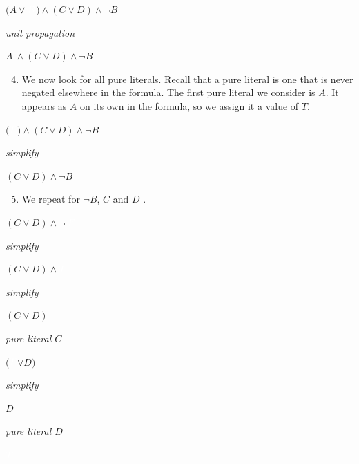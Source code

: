 \documentclass[a4paper,openany]{book}
\begin{document}
\begin{center}
\setlength{\fboxsep}{2pt}
\(
(A \lor \)\colorbox{id7-aubergine}{$ \textcolor{white}{B}$}\() \land (C \lor D) \land \neg B\)

\emph{unit propagation}

\(A ~\land (C \lor D) \land \neg B\)

\end{center}

\begin{enumerate}
      \setcounter{enumi}{3}
      \item We now look for all pure literals. Recall that a pure literal is one that is never negated elsewhere in the formula. The first pure literal we consider is $A$. It appears as $A$ on its own in the formula, so we assign it a value of $T$.
\end{enumerate}

\begin{center}
    \setlength{\fboxsep}{2pt}
    \(
    (\)\colorbox{id7-aubergine}{$ \textcolor{white}{T}$}\() \land (C \lor D) \land \neg B\)
    
    \emph{simplify}
    
    \((C \lor D) \land \neg B\)
\end{center}


\begin{enumerate}
\setcounter{enumi}{4}
\item We repeat for $\neg B$, $C$ and $D$ .
\end{enumerate}

\begin{center}
    \setlength{\fboxsep}{2pt}
    
    \((C \lor D) \land \neg ~ \)\colorbox{id7-aubergine}{$ \textcolor{white}{F}$}
    
    \emph{simplify}
    
    \((C \lor D) \land \)\colorbox{id7-aubergine}{$ \textcolor{white}{T}$}
        
    \emph{simplify}
    
    \((C \lor D)\)
    
    \emph{pure literal $C$}
    
    \((\)\colorbox{id7-aubergine}{$ \textcolor{white}{T}$}\( \lor D)\)
        
    \emph{simplify}
    
    \(D\)
    
    \emph{pure literal $D$}
    
    \colorbox{id7-aubergine}{$ \textcolor{white}{T}$}
\end{center}
\end{document}
